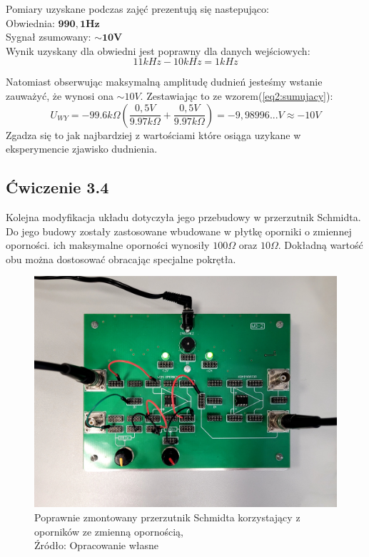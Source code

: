 \documentclass{article}
\begin{document}
      Pomiary uzyskane podczas zajęć prezentują się nastepująco: \\
      Obwiednia: $\mathbf{990,1Hz}$ \\
      Sygnał zsumowany: $\mathbf{\sim10V}$ \\

      Wynik uzyskany dla obwiedni jest poprawny dla danych wejściowych:
      \begin{equation}
        11kHz - 10kHz = 1kHz
      \end{equation}

      Natomiast obserwując maksymalną amplitudę dudnień jesteśmy wstanie zauważyć, że wynosi ona $\sim 10V$. Zestawiając to ze wzorem(\ref{eq2:sumujacy}):
      \begin{equation}
        U_{WY} = -99.6k\Omega(\frac{0,5V}{9.97k\Omega}+\frac{0,5V}{9.97k\Omega}) = - 9,98996...V \approx - 10V
      \end{equation}
      Zgadza się to jak najbardziej z wartościami które osiąga uzykane w eksperymencie zjawisko dudnienia.

      
    \subsection{Ćwiczenie 3.4}
      Kolejna modyfikacja układu dotyczyła jego przebudowy w przerzutnik Schmidta. Do jego budowy zostały zastosowane wbudowane w płytkę oporniki o zmiennej oporności. ich maksymalne oporności wynosiły $100\Omega$ oraz $10\Omega$. Dokładną wartość obu można dostosować obracając specjalne pokrętła.

      \begin{figure}[!ht]
        \centering
        \includegraphics[scale=0.07]{grafiki/Schmidt.jpg}
        \caption{Poprawnie zmontowany przerzutnik Schmidta korzystający z oporników ze zmienną opornością,
        \\Źródło: Opracowanie własne}
      \end{figure}
\end{document}
